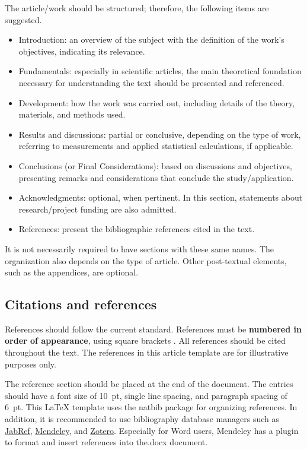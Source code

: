 The article/work should be structured; therefore, the following items are suggested.
%
\begin{itemize}[noitemsep,topsep=0ex] \itemsep=3pt
	\item Introduction: an overview of the subject with the definition of the work's objectives, indicating its relevance.
	\item Fundamentals: especially in scientific articles, the main theoretical foundation necessary for understanding the text should be presented and referenced.
	\item Development: how the work was carried out, including details of the theory, materials, and methods used.
	\item Results and discussions: partial or conclusive, depending on the type of work, referring to measurements and applied statistical calculations, if applicable.
	\item Conclusions (or Final Considerations): based on discussions and objectives, presenting remarks and considerations that conclude the study/application.
	\item Acknowledgments: optional, when pertinent. In this section, statements about research/project funding are also admitted.
	\item References: present the bibliographic references cited in the text.
\end{itemize}
%
It is not necessarily required to have sections with these same names. The organization also depends on the type of article.
Other post-textual elements, such as the appendices, are optional.

\subsection{Citations and references}

References should follow the current standard. References must be \textbf{numbered in order of appearance}, using square brackets \cite{Gomes-2015}. All references should be cited throughout the text. The references \cite{Mareze-2017,Fonseca-2013,Brandao-2017,Gomes-2015,Oppenheim-2010,Muller-2001,Mareze-2019,aev:piccini2020} in this article template are for illustrative purposes only.

The reference section should be placed at the end of the document. The entries should have a font size of 10~pt, single line spacing, and paragraph spacing of 6~pt. This \LaTeX\xspace template uses the {\ttfamily natbib} package for organizing references. In addition, it is recommended to use bibliography database managers such as \href{http://www.jabref.org/}{JabRef}, \href{http://www.mendeley.com}{Mendeley}, and \href{https://www.zotero.org/}{Zotero}. Especially for Word users, Mendeley has a plugin to format and insert references into the.docx document.

